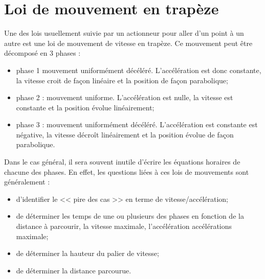 \documentclass[10pt,fleqn]{article} %
\begin{document}
\section{Loi de mouvement en trapèze}
\noindent
\begin{minipage}[c]{.48\linewidth}
Une des lois usuellement suivie par un actionneur pour aller d'un point à un autre est une loi de mouvement de vitesse en trapèze.  Ce mouvement peut être décomposé en 3 phases : 
\begin{itemize}
\item phase 1 mouvement uniformément décéléré. L'accélération est donc constante, la vitesse croit de façon linéaire et la position de façon parabolique;
\item phase 2 : mouvement uniforme. L'accélération est nulle, la vitesse est constante et la position évolue linéairement;
\item phase 3 : mouvement uniformément décéléré. L'accélération est constante est négative, la vitesse décroît linéairement et la position évolue de façon parabolique. 
\end{itemize}


Dans le cas général, il sera souvent inutile d'écrire les équations horaires de chacune des phases. En effet, les questions liées à ces lois de mouvements sont généralement :
\begin{itemize}
\item d'identifier le << pire des cas >> en terme de vitesse/accélération;
\item de déterminer les temps de une ou plusieurs des phases en fonction de la distance à parcourir, la vitesse maximale, l'accélération accélérations maximale;
\item de déterminer la hauteur du palier de vitesse;
\item de déterminer la distance parcourue. 
\end{itemize}
\end{minipage}\hfill
\end{document}
